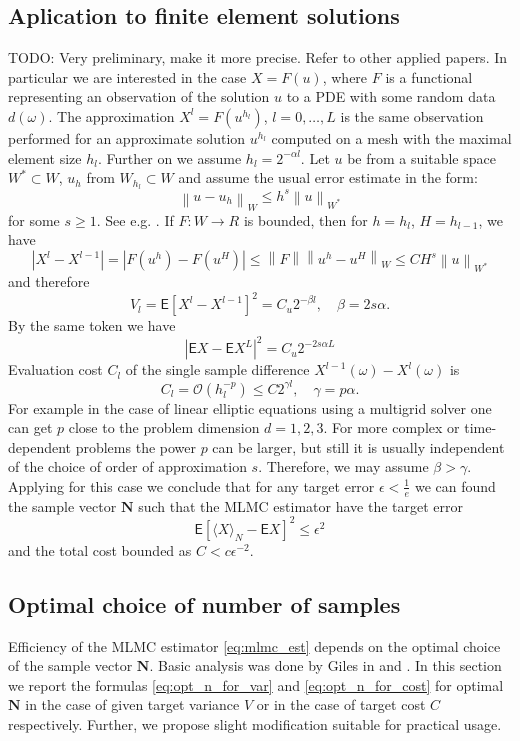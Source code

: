 \documentclass{article}
\def\vc#1{\mathbf{\boldsymbol{#1}}}     %
\def \E{{\mathsf E}}
\newcommand{\norm}[1]{\left\lVert#1\right\rVert}
\def\todo#1{{\color{red}TODO: #1}}
\def\avg#1{\langle#1\rangle}
\def\abs#1{|#1|}
\begin{document}
\subsection{Aplication to finite element solutions}
\todo{Very preliminary, make it more precise. Refer to other applied papers.}
In particular we are interested in the case $X=F(u)$, where $F$ is a functional representing an observation of
the solution $u$ to a PDE with some random data $d(\omega)$. The approximation $X^l = F(u^{h_l})$, $l=0,\dots,L$ is the same observation performed for an approximate solution $u^{h_l}$ computed on a mesh with the maximal element size $h_l$. Further on we assume $h_l = 2^{-\alpha l}$. Let $u$ be from a suitable space 
$W^* \subset W$, $u_h$ from $W_{h_l} \subset W$ and assume the usual error estimate in the form:
\[
	\norm{u - u_h}_{W} \le h^s \norm{u}_{W^*}
\] 
for some $s\ge 1$. See e.g. \cite{Evans1998}.
If $F:W \to R$ is bounded, then for $h=h_l$, $H=h_{l-1}$, we have
\[
	\abs{X^l - X^{l-1}} = \abs{F(u^h) - F(u^H)} \le \norm{F}\norm{u^h - u^H}_W \le C H^s\norm{u}_{W^*}
\]
and therefore 
\begin{equation}
    \label{eq:level_var_pde_est}
    V_l =  \E[X^l - X^{l-1}]^2 = C_u 2^{-\beta l},\quad \beta = 2s\alpha.
\end{equation}
By the same token we have 
\begin{equation}
    \label{eq:aprox_pde_est}
    \abs{\E X - \E X^L}^2 = C_u 2^{-2s\alpha L}
\end{equation}
Evaluation cost $C_l$ of the single sample difference $X^{l-1}(\omega) - X^l(\omega)$ is
\[
  C_l = \mathcal O( h_l^{-p}) \le C 2^{\gamma l}, \quad \gamma = p\alpha.
\]
For example in the case of linear elliptic equations using a multigrid solver one can get $p$ close to the problem dimension $d=1,2,3$. For more complex or time-dependent problems the power $p$ can be larger, but 
still it is usually independent of the choice of order of approximation $s$. Therefore, we may assume
$\beta > \gamma$. Applying \cite[Theorem 1]{Giles2015} for this case we conclude that for any target error 
$\epsilon< \frac{1}{e}$ we can found the sample vector $\vc N$ such that the MLMC estimator have the target error
\[
  \E[\avg{X}_N - \E X]^2 \le \epsilon^2
\]
and the total cost bounded as $C < c \epsilon^{-2}$.


\subsection{Optimal choice of number of samples}
Efficiency of the MLMC estimator \eqref{eq:mlmc_est} depends on the optimal choice of the sample vector $\vc N$. Basic analysis was done by Giles in \cite{Giles2008} and \cite{Giles2015}. In this section we report the formulas \eqref{eq:opt_n_for_var} and \eqref{eq:opt_n_for_cost} for optimal $\vc N$ in the case of given target variance $V$ or in the case of target cost $C$ respectively. Further, we propose slight modification suitable for practical usage.
\end{document}
